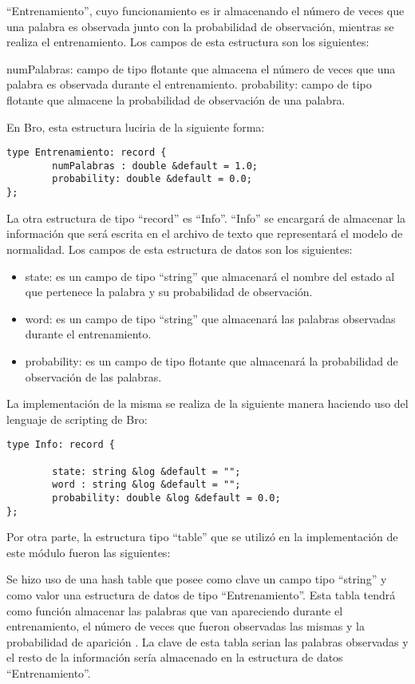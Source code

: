 “Entrenamiento”, cuyo funcionamiento es ir almacenando el número de veces que una palabra es observada junto con la probabilidad de observación, mientras se realiza el entrenamiento. Los campos de esta estructura son los siguientes:

numPalabras: campo de tipo flotante que almacena el número de veces que una palabra es observada durante el entrenamiento.
probability: campo de tipo flotante que almacene la probabilidad de observación de una palabra.

En Bro, esta estructura luciria de la siguiente forma:

\begin{verbatim}
type Entrenamiento: record { 
        numPalabras : double &default = 1.0;
        probability: double &default = 0.0;
};
\end{verbatim}

La otra estructura de tipo “record” es “Info”. “Info” se encargará de almacenar la información que será escrita en el archivo de texto que representará el modelo de normalidad. Los campos de esta estructura de datos son los siguientes:

\begin{itemize}
\item state: es un campo de tipo “string” que almacenará el nombre del estado al que pertenece la palabra y su probabilidad de observación.
\item word: es un campo de tipo “string” que almacenará las palabras observadas durante el entrenamiento.
\item probability: es un campo de tipo flotante que almacenará la probabilidad de observación de las palabras. 
\end{itemize}
La implementación de la misma se realiza de la siguiente manera haciendo uso del lenguaje de scripting de Bro:

\begin{verbatim}
type Info: record {

        state: string &log &default = "";
        word : string &log &default = "";
        probability: double &log &default = 0.0;
};
\end{verbatim}

Por otra parte, la estructura tipo “table” que se utilizó en la implementación de este módulo fueron las siguientes:

Se hizo uso de una hash table que posee como clave un campo tipo “string” y como valor una estructura de datos de tipo “Entrenamiento”. Esta tabla tendrá como función almacenar las palabras que van apareciendo durante el entrenamiento, el número de veces que fueron observadas las mismas y la probabilidad de aparición . La clave de esta tabla serian las palabras observadas y el resto de la información sería almacenado en la estructura de datos “Entrenamiento”.

